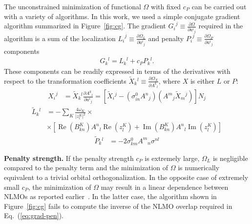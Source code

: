 \documentclass[aps,prl,reprint,amsmath,amssymb]{revtex4-1}
\begin{document}
The unconstrained minimization of functional $\Omega$ with fixed $c_P$ can be carried out with a variety of algorithms. In this work, we used a simple conjugate gradient algorithm summarized in Figure~\ref{fig:cg}. The gradient ${G_i}^j \equiv \frac{\partial \Omega}{\partial {a^i}_j}$  required in the algorithm is a sum of the localization ${L_i}^j \equiv \frac{\partial \Omega_L}{\partial {a^i}_j}$ and penalty ${P_i}^j \equiv \frac{\partial \Omega_P}{\partial {a^i}_j}$ components
%
\begin{equation} \label{eq:grad}
\begin{split}
G{_k}^{l} = L{_k}^{l} + c_P P{_k}^{l}.
\end{split}
\end{equation}
%
These components can be readily expressed in terms of the derivatives with respect to the transformation coefficients $\tilde{X}{_k}^l \equiv \frac{\partial \Omega_X}{\partial {A^k}_l}$, where $X$ is either $L$ or $P$:
%
\begin{equation} \label{eq:grad-convert}
\begin{split}
{X_i}^j & = \tilde{X}{_k}^l \frac{\partial {A^k}_l}{\partial {a^i}_j} = \left[ \tilde{X}{_i}^j - ( \sigma_{in}^0 {A^n}_j ) ( {A^m}_j \tilde{X}{_m}^j ) \right] N_j 
\end{split}
\end{equation}
%
\begin{equation} \label{eq:grad-loc}
\begin{split}
\tilde{L}{_k}^l & = - \sum_K \frac{4 \omega_K}{\vert z_{l}^{K} \vert^2} \times \\ 
&\times \left[  \operatorname{Re}(B^{K}_{kn}) {A^{n}}_{l} \operatorname{Re}(z_{l}^{K}) + \operatorname{Im}(B^{K}_{kn}) {A^{n}}_{l} \operatorname{Im}(z_{l}^{K}) \right]
\end{split}
\end{equation}
%
\begin{equation} \label{eq:grad-pen}
\begin{split}
\tilde{P}{_k}^l & = -2 \sigma_{km}^0 {A^m}_n \sigma^{nl} 
\end{split}
\end{equation}
%

\textbf{Penalty strength.} If the penalty strength $c_P$ is extremely large, $\Omega_L$ is negligible compared to the penalty term and the minimization of $\Omega$ is numerically equivalent to a trivial orbital orthogonalization. In the opposite case of extremely small $c_P$, the minimization of $\Omega$ may result in a linear dependence between NLMOs as reported earlier~\cite{cui2010efficient}. %
In the latter case, the algorithm shown in Figure~\ref{fig:cg} fails to compute the inverse of the NLMO overlap required in Eq.~(\ref{eq:grad-pen}). 
\end{document}
